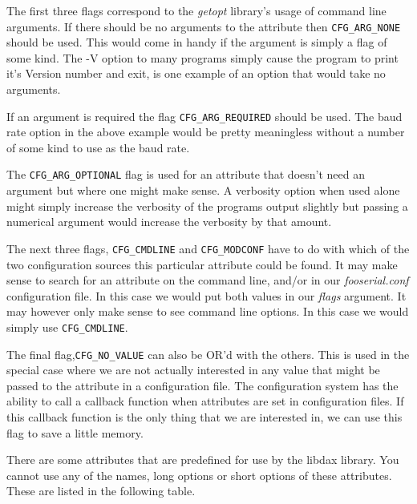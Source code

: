 The first three flags correspond to the \textit{getopt} library's usage of
command line arguments.  If there should be no arguments to the attribute then
\verb|CFG_ARG_NONE| should be used.  This would come in handy if the argument is
simply a flag of some kind.  The -V option to many programs simply cause the
program to print it's Version number and exit, is one example of an option that
would take no arguments.

If an argument is required the flag \verb|CFG_ARG_REQUIRED| should be used.  The
baud rate option in the above example would be pretty meaningless without a
number of some kind to use as the baud rate.

The \verb|CFG_ARG_OPTIONAL| flag is used for an attribute that doesn't need an
argument but where one might make sense.  A verbosity option when used alone
might simply increase the verbosity of the programs output slightly but passing
a numerical argument would increase the verbosity by that amount.

The next three flags, \verb|CFG_CMDLINE| and
\verb|CFG_MODCONF| have to do with which of the two configuration sources this
particular attribute could be found.  It may make sense to search for an
attribute on the command line, and/or in our
\textit{fooserial.conf} configuration file.  In this case we would put both
values in our \textit{flags} argument.  It may however only make sense to see
command line options.  In this case we would simply use \verb|CFG_CMDLINE|.

The final flag,\verb|CFG_NO_VALUE| can also be OR'd with the others.  This is
used in the special case where we are not actually interested in any value that
might be passed to the attribute in a configuration file.  The configuration
system has the ability to call a callback function when attributes are set in
configuration files.  If this callback function is the only thing that we are
interested in, we can use this flag to save a little memory.

There are some attributes that are predefined for use by the libdax library.
You cannot use any of the names, long options or short options of these
attributes.  These are listed in the following table.

